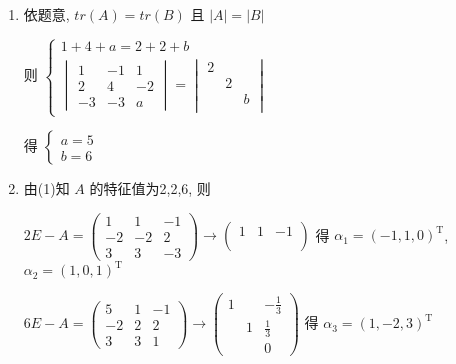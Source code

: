 	 \paragraph{} %
		 \begin{enumerate}
			 \item %
			       依题意, \( tr(A) = tr(B) \) 且 \( |A| = |B| \)

			       则 \( \begin{cases}
				       1+4+a = 2+2+b \\
				       \begin{vmatrix}
					       1  & -1 & 1  \\
					       2  & 4  & -2 \\
					       -3 & -3 & a
				       \end{vmatrix} = \begin{vmatrix}
					                       2 &   &   \\
					                         & 2 &   \\
					                         &   & b \\
				                       \end{vmatrix}
			       \end{cases} \)

			       得 \( \begin{cases}
				       a = 5 \\
				       b = 6
			       \end{cases} \)
			 \item %
			       由(1)知 \( A \) 的特征值为2,2,6, 则

			       \( 2E-A = \begin{pmatrix}
				       1  & 1  & -1 \\
				       -2 & -2 & 2  \\
				       3  & 3  & -3
			       \end{pmatrix} \rightarrow \begin{pmatrix}
				       1 & 1 & -1 \\
				         &   &    \\
				         &   &
			       \end{pmatrix} \) 得 \( \alpha_{1} = (-1,1,0)^{\mathrm{T}} \), \( \alpha_{2} = (1,0,1)^{\mathrm{T}} \)

			       \( 6E-A = \begin{pmatrix}
				       5  & 1 & -1 \\
				       -2 & 2 & 2  \\
				       3  & 3 & 1
			       \end{pmatrix} \rightarrow \begin{pmatrix}
				       1 &   & -\frac{1}{3} \\
				         & 1 & \frac{1}{3}  \\
				         &   & 0
			       \end{pmatrix} \) 得 \( \alpha_{3} = (1,-2,3)^{\mathrm{T}} \)


\end{enumerate}
